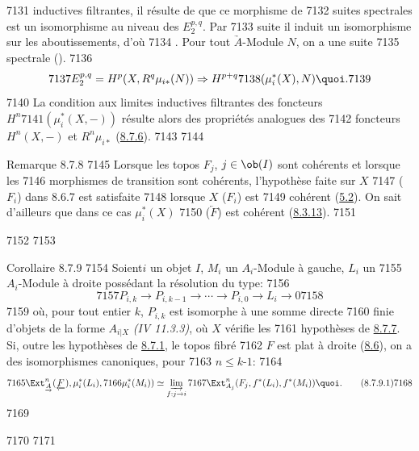   7131	inductives filtrantes, il résulte de  que ce morphisme de
  7132	suites spectrales est un isomorphisme au niveau des $E^{p, q}_2$. Par
  7133	suite il induit un isomorphisme sur les aboutissements, d'où
  7134	. Pour tout $\underrightarrow{A}$-Module $N$, on a une suite
  7135	spectrale ().
  7136	$$
  7137	E^{p, q}_2 = H^{p} (X, R^q \mu_{i\ast} (N)) \Rightarrow H^{p+q}
  7138	(\mu^{\ast}_i (X), N){\quoi}.
  7139	$$
  7140	La condition aux limites inductives filtrantes des foncteurs $H^{n}
  7141	(\mu^{\ast}_i (X, -))$ résulte alors des propriétés analogues des
  7142	foncteurs $H^{n} (X, -)$ et $R^n \mu_{i\ast}$ (\hyperref[VI.cor8.7.6]{8.7.6}).
  7143	
  7144	\begin{enonce*}[remark]{Remarque 8.7.8}
  7145	Lorsque les topos $F_j$, $j \in \ob (I)$ sont cohérents et lorsque les
  7146	morphismes de transition sont cohérents, l'hypothèse faite sur $X$
  7147	(\resp $F_i$) dans 8.6.7 est satisfaite
  7148	lorsque $X$ (\resp $F_i$) est
  7149	cohérent (\hyperref[VI.cor5.2]{5.2}). On sait d'ailleurs que dans ce cas $\mu^{\ast}_i (X)$
  7150	(\resp $\underleftarrow{F}$) est cohérent (\hyperref[VI.thm8.3.13]{8.3.13}).
  7151	\end{enonce*}
  7152	
  7153	\begin{enonce*}{Corollaire 8.7.9}
  7154	Soient\pageoriginale $i$ un objet $I$, $M_i$ un $A_i$-Module à gauche, $L_i$ un
  7155	$A_i$-Module à droite possédant la résolution du type:
  7156	$$
  7157	P_{i, k} \to P_{i, k-1} \to \cdots \to P_{i, 0} \to L_i \to 0
  7158	$$
  7159	où, pour tout entier $k$, $P_{i, k}$ est isomorphe à une somme directe
  7160	finie d'objets de la forme $A_{i|X}$ \emph{(IV 11.3.3)}, où $X$ vérifie les
  7161	hypothèses de \hyperref[VI.cor8.7.7]{8.7.7}. Si, outre les hypothèses de \hyperref[VI.subsubsec8.7.1]{8.7.1}, le topos fibré
  7162	$F$ est plat à droite (\hyperref[VI.subsec8.6]{8.6}), on a des isomorphismes canoniques, pour
  7163	$n \leq k$-$1$:
  7164	\begin{equation*}
  7165	\Ext^n_{\underrightarrow{A}}(\underleftarrow{F}), \mu^{\ast}_i(L_i),
  7166	\mu^{\ast}_i (M_i)) \simeq \varinjlim_{f : j \to i}
  7167	\Ext^{n}_{A_j} (F_j, f^{\ast}(L_i), f^{\ast} (M_i)){\quoi}.\tag{8.7.9.1}
  7168	\end{equation*}
  7169	\end{enonce*}
  7170	
  7171	\noindent
